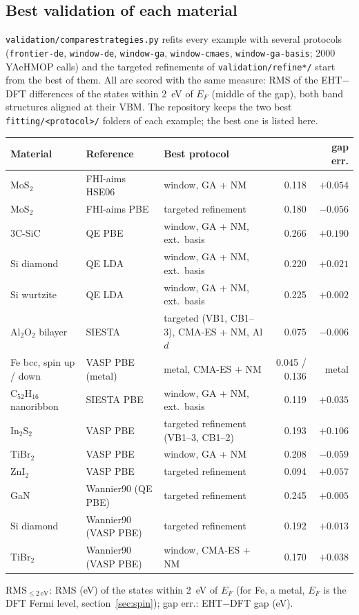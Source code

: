 \documentclass[11pt,a4paper]{article}
\newcommand{\cmd}[1]{\texttt{#1}}
\renewcommand{\_}{\origunderscore\allowbreak}
\begin{document}
\subsection{Best validation of each material}\label{sec:refine-results}
\cmd{validation/compare\_strategies.py} refits every example with several protocols (\cmd{frontier-de}, \cmd{window-de},
\cmd{window-ga}, \cmd{window-cmaes}, \cmd{window-ga-basis}; 2000 YAeHMOP calls) and the targeted refinements of
\cmd{validation/refine*/} start from the best of them. All are scored with the same measure: RMS of the EHT$-$DFT
differences of the states within 2~eV of $E_F$ (middle of the gap), both band structures aligned at their VBM. The
repository keeps the two best \cmd{fitting/<protocol>/} folders of each example; the best one is listed here.
\begin{center}\small
\begin{tabularx}{\textwidth}{l l L r r}
\toprule
Material & Reference & Best protocol &  & gap err. \\
\midrule
MoS$_2$ & FHI-aims HSE06 & window, GA + NM & 0.118 & $+0.054$ \\
MoS$_2$ & FHI-aims PBE & targeted refinement & 0.180 & $-0.056$ \\
3C-SiC & QE PBE & window, GA + NM, ext.\ basis & 0.266 & $+0.190$ \\
Si diamond & QE LDA & window, GA + NM, ext.\ basis & 0.220 & $+0.021$ \\
Si wurtzite & QE LDA & window, GA + NM, ext.\ basis & 0.225 & $+0.002$ \\
Al$_2$O$_2$ bilayer & SIESTA & targeted (VB1, CB1--3), CMA-ES + NM, Al $d$ & 0.075 & $-0.006$ \\
Fe bcc, spin up / down & VASP PBE (metal) & metal, CMA-ES + NM & 0.045 / 0.136 & metal \\
C$_{52}$H$_{16}$ nanoribbon & SIESTA PBE & window, GA + NM, ext.\ basis & 0.119 & $+0.035$ \\
In$_2$S$_2$ & VASP PBE & targeted refinement (VB1--3, CB1--2) & 0.193 & $+0.106$ \\
TiBr$_2$ & VASP PBE & window, GA + NM & 0.208 & $-0.059$ \\
ZnI$_2$ & VASP PBE & targeted refinement & 0.094 & $+0.057$ \\
GaN & Wannier90 (QE PBE) & targeted refinement & 0.245 & $+0.005$ \\
Si diamond & Wannier90 (VASP PBE) & targeted refinement & 0.192 & $+0.013$ \\
TiBr$_2$ & Wannier90 (VASP PBE) & window, CMA-ES + NM & 0.170 & $+0.038$ \\
\bottomrule
\end{tabularx}\end{center}
{\footnotesize RMS$_{\le 2\,\mathrm{eV}}$: RMS (eV) of the states within 2~eV of $E_F$ (for Fe, a metal, $E_F$ is the DFT Fermi
level, section~\ref{sec:spin}); gap err.: EHT$-$DFT gap (eV).}
\end{document}

